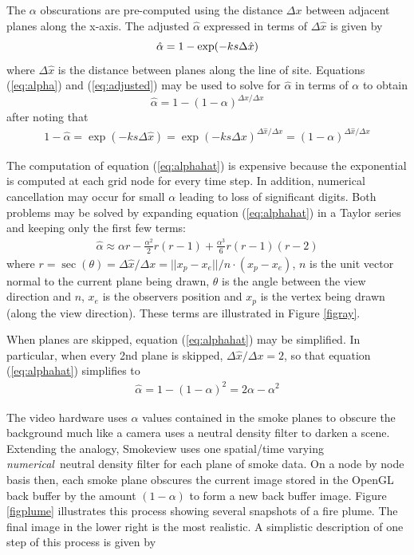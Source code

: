 The $\alpha$ obscurations are pre-computed using the distance
$\Delta x$ between adjacent planes along the x-axis. The adjusted
$\hat{\alpha}$ expressed in terms of $\Delta\hat{x}$ is given by
\begin{equation}
\label{eq:adjusted}
\hat{\alpha}=1-\exp(-ks\Delta \hat{x})\\
\end{equation}
where $\Delta\hat{x}$ is the distance between planes along the line of site.
Equations (\ref{eq:alpha}) and (\ref{eq:adjusted}) may be used to
solve for $\hat{\alpha}$ in terms of $\alpha$ to obtain
\begin{equation}
\label{eq:alphahat}
\hat{\alpha}=1-(1-\alpha)^{\Delta\hat{x}/\Delta x}
\end{equation}
after noting that
\begin{eqnarray*}
1-\hat{\alpha}=\exp(-ks\Delta\hat{x})=\exp(-ks\Delta
x)^{\Delta\hat{x}/\Delta x}=(1-\alpha)^{\Delta\hat{x}/\Delta x}
\end{eqnarray*}

The computation of equation (\ref{eq:alphahat}) is expensive
because the exponential is computed at each grid node for every
time step.  In addition, numerical cancellation may occur for
small $\alpha$ leading to loss of significant digits. Both
problems may be solved by expanding equation (\ref{eq:alphahat})
in a Taylor series and keeping only the first few terms:
\begin{eqnarray*}
\hat{\alpha}\approx \alpha r -
\frac{\alpha^2}{2}r(r-1)+\frac{\alpha^3}{6}r(r-1)(r-2)
\end{eqnarray*}
where $r=\sec(\theta)=\Delta \hat{x}/\Delta
x=||x_p-x_e||/n\cdot(x_p-x_e)$, $n$ is the unit vector normal to
the current plane being drawn, $\theta$ is the angle between the
view direction and $n$, $x_e$ is the observers position and $x_p$
is the vertex being drawn (along the view direction).  These terms
are illustrated in Figure \ref{figray}.

When planes are skipped, equation (\ref{eq:alphahat}) may be simplified.  In particular,
when every 2nd plane is
skipped, $\Delta\hat{x}/\Delta x=2$, so that equation (\ref{eq:alphahat}) simplifies to
\begin{eqnarray*}
\hat{\alpha}=1-(1-\alpha)^2=2\alpha-\alpha^2
\end{eqnarray*}

The video hardware uses $\alpha$ values contained in the smoke
planes to obscure the background much like a camera uses a neutral
density filter to darken a scene.  Extending the analogy,
Smokeview uses one spatial/time varying {\em numerical}\ neutral
density filter for each plane of smoke data.  On a node by node
basis then, each smoke plane obscures the current image stored in
the OpenGL back buffer by the amount $(1-\alpha)$ to form a new
back buffer image.  Figure \ref{figplume} illustrates this process
showing several snapshots of a fire plume. The final image in the
lower right is the most realistic. A simplistic description of one
step of this process is given by

